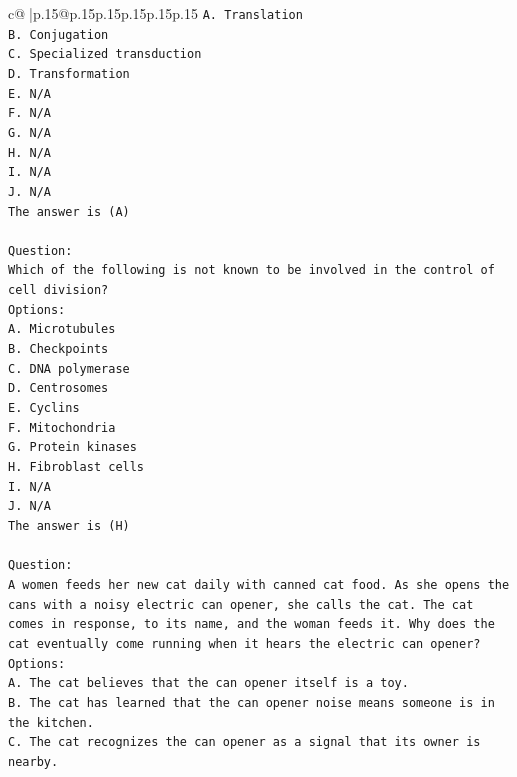 \documentclass{article}
\begin{document}
{\begin{supertabular}{c@{$\;$}|p{.15\linewidth}@{}p{.15\linewidth}p{.15\linewidth}p{.15\linewidth}p{.15\linewidth}p{.15\linewidth}}
{{{\texttt{A. Translation} \\
\texttt{B. Conjugation} \\
\texttt{C. Specialized transduction} \\
\texttt{D. Transformation} \\
\texttt{E. N/A} \\
\texttt{F. N/A} \\
\texttt{G. N/A} \\
\texttt{H. N/A} \\
\texttt{I. N/A} \\
\texttt{J. N/A} \\
\texttt{The answer is (A)} \\
\\ 
\texttt{Question:} \\
\texttt{Which of the following is not known to be involved in the control of cell division?} \\
\texttt{Options:} \\
\texttt{A. Microtubules} \\
\texttt{B. Checkpoints} \\
\texttt{C. DNA polymerase} \\
\texttt{D. Centrosomes} \\
\texttt{E. Cyclins} \\
\texttt{F. Mitochondria} \\
\texttt{G. Protein kinases} \\
\texttt{H. Fibroblast cells} \\
\texttt{I. N/A} \\
\texttt{J. N/A} \\
\texttt{The answer is (H)} \\
\\ 
\texttt{Question:} \\
\texttt{A women feeds her new cat daily with canned cat food. As she opens the cans with a noisy electric can opener, she calls the cat. The cat comes in response, to its name, and the woman feeds it. Why does the cat eventually come running when it hears the electric can opener?} \\
\texttt{Options:} \\
\texttt{A. The cat believes that the can opener itself is a toy.} \\
\texttt{B. The cat has learned that the can opener noise means someone is in the kitchen.} \\
\texttt{C. The cat recognizes the can opener as a signal that its owner is nearby.} \\
}}}
\end{supertabular}}
\end{document}
